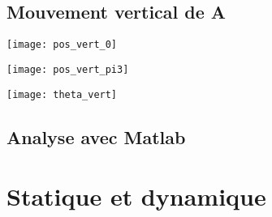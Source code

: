 \documentclass{udes_rapport} %
\begin{document}
\subsection{Mouvement vertical de A}

\noindent\begin{minipage}{\textwidth} 
\begin{minipage}{0.5\textwidth}
  \centering
  \texttt{[image: pos\_vert\_0]}
  \label{pos_vert:position_verticale_initiale}
\end{minipage}%
\begin{minipage}{0.5\textwidth}
  \centering 
  \texttt{[image: pos\_vert\_pi3]} 
  \label{pos_vert:position_verticale_finale} 
\end{minipage} 
\label{pos_vert} 
\end{minipage}

\begin{center}
	\centering
	\texttt{[image: theta\_vert]}
	\label{composantes_verticale_theta}
\end{center}
\subsection{Analyse avec Matlab}



\section{Statique et dynamique}
\end{document}
